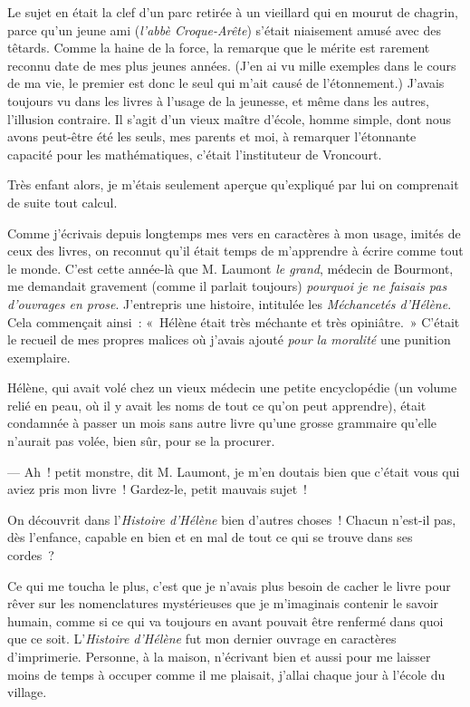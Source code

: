 \documentclass[french,twoside]{book} %
\begin{document}
\noindent Le sujet en était la clef d’un parc retirée à un vieillard qui en mourut de chagrin, parce qu’un jeune ami (\emph{l’abbè Croque-Arête}) s’était niaisement amusé avec des têtards. Comme la haine de la force, la remarque que le mérite est rarement reconnu date de mes plus jeunes années. (J’en ai vu mille exemples dans le cours de ma vie, le premier est donc le seul qui m’ait causé de l’étonnement.) J’avais toujours vu dans les livres à l’usage de la jeunesse, et même dans les autres, l’illusion contraire. Il s’agit d’un vieux maître d’école, homme simple, dont nous avons  peut-être été les seuls, mes parents et moi, à remarquer l’étonnante capacité pour les mathématiques, c’était l’instituteur de Vroncourt.\par
Très enfant alors, je m’étais seulement aperçue qu’expliqué par lui on comprenait de suite tout calcul.\par
Comme j’écrivais depuis longtemps mes vers en caractères à mon usage, imités de ceux des livres, on reconnut qu’il était temps de m’apprendre à écrire comme tout le monde. C’est cette année-là que M. Laumont \emph{le grand}, médecin de Bourmont, me demandait gravement (comme il parlait toujours) \emph{pourquoi je ne faisais pas d’ouvrages en prose}. J’entrepris une histoire, intitulée les \emph{Méchancetés d’Hélène}. Cela commençait ainsi : « Hélène était très méchante et très opiniâtre. » C’était le recueil de mes propres malices où j’avais ajouté \emph{pour la moralité} une punition exemplaire.\par
Hélène, qui avait volé chez un vieux médecin une petite encyclopédie (un volume relié en peau, où il y avait les noms de tout ce qu’on peut apprendre), était condamnée à passer un mois sans autre livre qu’une grosse grammaire qu’elle n’aurait pas volée, bien sûr, pour se la procurer.\par
— Ah ! petit monstre, dit M. Laumont, je m’en  doutais bien que c’était vous qui aviez pris mon livre ! Gardez-le, petit mauvais sujet !\par
On découvrit dans l’\emph{Histoire d’Hélène} bien d’autres choses ! Chacun n’est-il pas, dès l’enfance, capable en bien et en mal de tout ce qui se trouve dans ses cordes ?\par
Ce qui me toucha le plus, c’est que je n’avais plus besoin de cacher le livre pour rêver sur les nomenclatures mystérieuses que je m’imaginais contenir le savoir humain, comme si ce qui va toujours en avant pouvait être renfermé dans quoi que ce soit. L’\emph{Histoire d’Hélène} fut mon dernier ouvrage en caractères d’imprimerie. Personne, à la maison, n’écrivant bien et aussi pour me laisser moins de temps à occuper comme il me plaisait, j’allai chaque jour à l’école du village.\par
\end{document}
